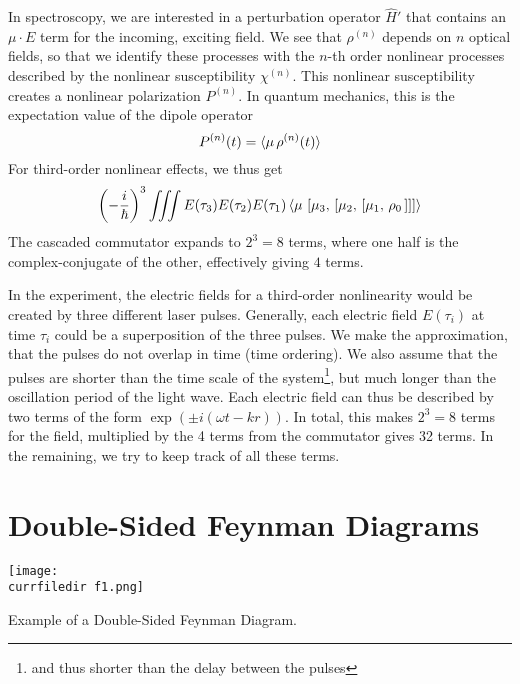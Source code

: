 In spectroscopy, we are interested in a perturbation operator $\hat{H}'$ that contains an $\mu \cdot E$ term for the incoming, exciting field. We see that $\rho^{(n)}$ depends on $n$ optical fields, so that we identify  these processes with the $n$-th order nonlinear processes described by the nonlinear susceptibility $\chi^{(n)}$. This nonlinear susceptibility creates a nonlinear polarization $P^{(n)}$. In quantum mechanics, this is the expectation value of the dipole operator 
\begin{equation}
P^{(n)} (t) = \braket{ \mu \, \rho^{(n)}(t) }
\end{equation}
For third-order nonlinear effects, we thus get
\begin{equation}
 \left(- \frac{i}{\hbar}\right)^3   \iiint E(\tau_3) E(\tau_2) E(\tau_1)
 \braket{ \mu \, 
  \left[ \mu_3 , \, \left[ \mu_2 , \, \left[ \mu_1 , \, \rho_0 \, \right] \right]  \right] }
  \label{eq:2d-p3-commutator}
\end{equation}
The cascaded commutator expands to $2^3=8$ terms, where one half is the complex-conjugate of the other, effectively giving $4$ terms.

In the experiment, the electric fields for a third-order nonlinearity would be created by three different laser pulses. Generally, each  electric field $E(\tau_i)$ at time $\tau_i$ could be a superposition of the three pulses. We make the approximation, that the pulses do not overlap in time (time ordering). We also assume that the pulses are shorter  than the time scale of the system\footnote{and thus shorter than the delay between the pulses}, but much longer than the oscillation period of the light wave. Each electric field can thus be described by two terms of the form $\exp( \pm i (\omega t - k r) )$. In total, this makes $2^3=8$ terms for the field, multiplied by the 4 terms from the commutator gives 32 terms.
In the remaining, we try to keep track of all these terms.


\section{Double-Sided Feynman Diagrams}

\begin{marginfigure}
\texttt{[image: \\currfiledir f1.png]}
\caption{
Example of a Double-Sided Feynman Diagram.}
\label{fig_2d_f1}
\end{marginfigure}

